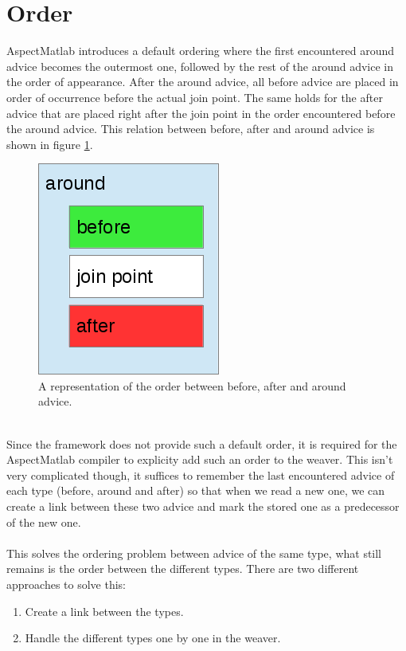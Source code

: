 \documentclass[a4paper]{report}
\begin{document}
\section{Order}
AspectMatlab introduces a default ordering where the first encountered around advice becomes the outermost one, followed by the rest of the around advice in the order of appearance. After the around advice, all before advice are placed in order of occurrence before the actual join point. The same holds for the after advice that are placed right after the join point in the order encountered before the around advice. This relation between before, after and around advice is shown in figure \ref{fig:AspectMatlab_Order}.\\
\begin{figure}[h!]
\center
\includegraphics[scale=0.5]{images/Languages/AspectMatlab_Order.png}
\caption{A representation of the order between before, after and around advice.}
\label{fig:AspectMatlab_Order}
\end{figure}
\\
Since the framework does not provide such a default order, it is required for the AspectMatlab compiler to explicity add such an order to the weaver. This isn't very complicated though, it suffices to remember the last encountered advice of each type (before, around and after) so that when we read a new one, we can create a link between these two advice and mark the stored one as a predecessor of the new one.\\
\\
This solves the ordering problem between advice of the same type, what still remains is the order between the different types. There are two different approaches to solve this:
\begin{enumerate}
\item Create a link between the types.
\item Handle the different types one by one in the weaver.
\end{enumerate}
\end{document}
